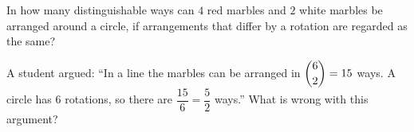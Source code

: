In how many distinguishable ways can $4$ red marbles and $2$ white marbles be arranged around a circle, if arrangements that differ by a rotation are regarded as the same?

A student argued: ``In a line the marbles can be arranged in $\dbinom62=15$ ways. A circle has $6$ rotations, so there are $\dfrac{15}{6}=\dfrac{5}{2}$ ways.'' What is wrong with this argument?
